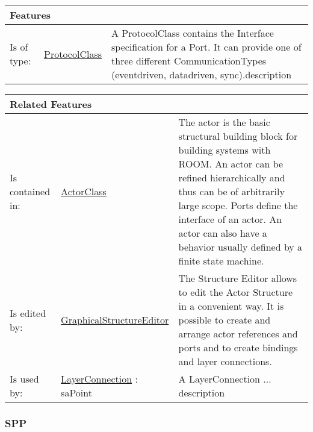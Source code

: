 			
			\vspace{\baselineskip}
			\begingroup
			\renewcommand{\arraystretch}{1.8} %
			\parbox{\textwidth}{
			\begin{longtable}{l l p{}}
				\multicolumn{2}{l}{\textbf{\large Features}} & \\
				\hline
			Is of type: & \tabitem \hyperlink{ref:ProtocolClass}{ProtocolClass}  & A ProtocolClass contains the Interface specification for a Port. It can provide one of three different CommunicationTypes (eventdriven, datadriven, sync).description \\
			\hline
			\end{longtable}	
			}
			\endgroup
			\vspace{\baselineskip}
			
			\vspace{\baselineskip}
			\begingroup
			\renewcommand{\arraystretch}{1.8} %
			\parbox{\textwidth}{
			\begin{longtable}{l l p{}}
				\multicolumn{2}{l}{\textbf{\large Related Features}} & \\
				\hline
			Is contained in: & \tabitem \hyperlink{ref:ActorClass}{ActorClass}  & The actor is the basic structural building block for building systems with ROOM. An actor can be refined hierarchically and thus can be of arbitrarily large scope. Ports define the interface of an actor. An actor can also have a behavior usually defined by a finite state machine. \\
			\hline
			Is edited by: & \tabitem \hyperlink{ref:GraphicalStructureEditor}{GraphicalStructureEditor}  & The Structure Editor allows to edit the Actor Structure in a convenient way. It is possible to create and arrange actor references and ports and to create bindings and layer connections.\\
			\hline
			Is used by: & \tabitem \hyperlink{ref:LayerConnection}{LayerConnection} : saPoint & A LayerConnection ... description \\
			\hline
			\end{longtable}	
			}
			\endgroup
			\vspace{\baselineskip}
			
			
		
		\subsubsection{SPP}
			\hypertarget{ref:SPP}{}
			
